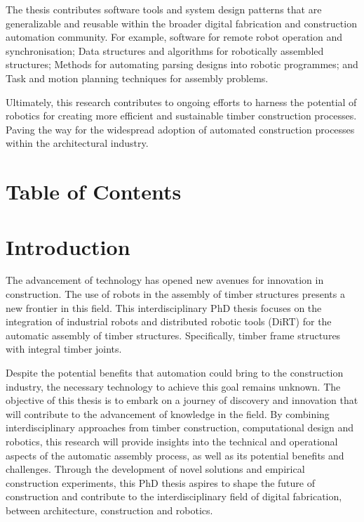 \documentclass[11pt]{book}
\begin{document}
The thesis contributes software tools and system design patterns that are generalizable and reusable within the broader digital fabrication and construction automation community. For example, software for remote robot operation and synchronisation; Data structures and algorithms for robotically assembled structures; Methods for automating parsing designs into robotic programmes; and Task and motion planning techniques for assembly problems.

Ultimately, this research contributes to ongoing efforts to harness the potential of robotics for creating more efficient and sustainable timber construction processes. Paving the way for the widespread adoption of automated construction processes within the architectural industry.


\newpage

\section{Table of Contents}


\tableofcontents
\vspace{1\baselineskip}

\newpage

\section{Introduction}

The advancement of technology has opened new avenues for innovation in construction. The use of robots in the assembly of timber structures presents a new frontier in this field. This interdisciplinary PhD thesis focuses on the integration of industrial robots and distributed robotic tools (DiRT) for the automatic assembly of timber structures. Specifically, timber frame structures with integral timber joints. 

Despite the potential benefits that automation could bring to the construction industry, the necessary technology to achieve this goal remains unknown. The objective of this thesis is to embark on a journey of discovery and innovation that will contribute to the advancement of knowledge in the field. By combining interdisciplinary approaches from timber construction, computational design and robotics, this research will provide insights into the technical and operational aspects of the automatic assembly process, as well as its potential benefits and challenges. Through the development of novel solutions and empirical construction experiments, this PhD thesis aspires to shape the future of construction and contribute to the interdisciplinary field of digital fabrication, between architecture, construction and robotics.
\end{document}
